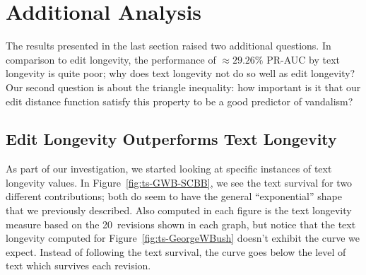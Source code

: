 \section{Additional Analysis}

The results presented in the last section raised two
additional questions.
In comparison to edit longevity, the performance of ${\approx}29.26\%$
PR-AUC by text longevity is quite poor;
why does text longevity not do so well as edit longevity?
Our second question is about the triangle inequality:
how important is it that our edit distance function satisfy
this property to be a good predictor of vandalism?

\subsection{Edit Longevity Outperforms Text Longevity}

As part of our investigation, we started looking at specific
instances of text longevity values.
In Figure~\ref{fig:ts-GWB-SCBB},
we see the text survival for two different contributions;
both do seem to have the general ``exponential'' shape
that we previously described.
Also computed in each figure is the text longevity measure based on
the 20~revisions shown in each graph, but notice that the text
longevity computed for
Figure~\ref{fig:ts-GeorgeWBush} doesn't exhibit the curve we expect.
Instead of following the text survival, the curve goes below the
level of text which survives each revision.

